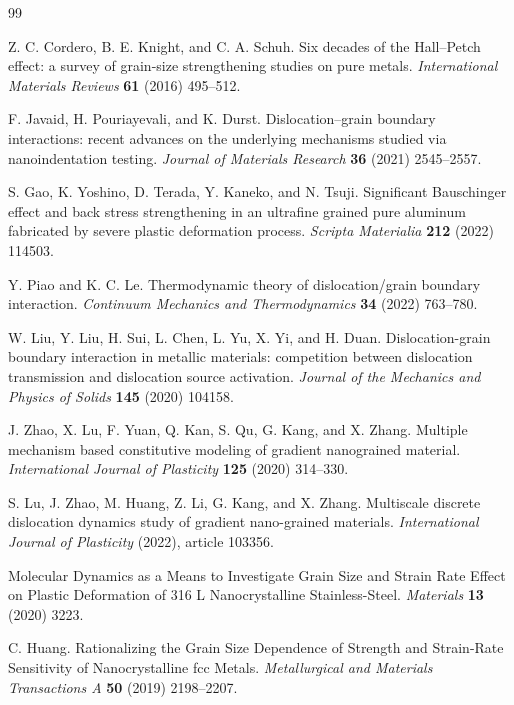 \begin{thebibliography}{99}

Z. C. Cordero, B. E. Knight, and C. A. Schuh.
\newblock Six decades of the Hall--Petch effect: a survey of grain-size strengthening studies on pure metals.
\newblock \emph{International Materials Reviews} \textbf{61} (2016) 495--512.

F. Javaid, H. Pouriayevali, and K. Durst.
\newblock Dislocation--grain boundary interactions: recent advances on the underlying mechanisms studied via nanoindentation testing.
\newblock \emph{Journal of Materials Research} \textbf{36} (2021) 2545--2557.

S. Gao, K. Yoshino, D. Terada, Y. Kaneko, and N. Tsuji.
\newblock Significant Bauschinger effect and back stress strengthening in an ultrafine grained pure aluminum fabricated by severe plastic deformation process.
\newblock \emph{Scripta Materialia} \textbf{212} (2022) 114503.

Y. Piao and K. C. Le.
\newblock Thermodynamic theory of dislocation/grain boundary interaction.
\newblock \emph{Continuum Mechanics and Thermodynamics} \textbf{34} (2022) 763--780.

W. Liu, Y. Liu, H. Sui, L. Chen, L. Yu, X. Yi, and H. Duan.
\newblock Dislocation-grain boundary interaction in metallic materials: competition between dislocation transmission and dislocation source activation.
\newblock \emph{Journal of the Mechanics and Physics of Solids} \textbf{145} (2020) 104158.

J. Zhao, X. Lu, F. Yuan, Q. Kan, S. Qu, G. Kang, and X. Zhang.
\newblock Multiple mechanism based constitutive modeling of gradient nanograined material.
\newblock \emph{International Journal of Plasticity} \textbf{125} (2020) 314--330.

S. Lu, J. Zhao, M. Huang, Z. Li, G. Kang, and X. Zhang.
\newblock Multiscale discrete dislocation dynamics study of gradient nano-grained materials.
\newblock \emph{International Journal of Plasticity} (2022), article 103356.

Molecular Dynamics as a Means to Investigate Grain Size and Strain Rate Effect on Plastic Deformation of 316 L Nanocrystalline Stainless-Steel.
\newblock \emph{Materials} \textbf{13} (2020) 3223.

C. Huang.
\newblock Rationalizing the Grain Size Dependence of Strength and Strain-Rate Sensitivity of Nanocrystalline fcc Metals.
\newblock \emph{Metallurgical and Materials Transactions A} \textbf{50} (2019) 2198--2207.


\end{thebibliography}
